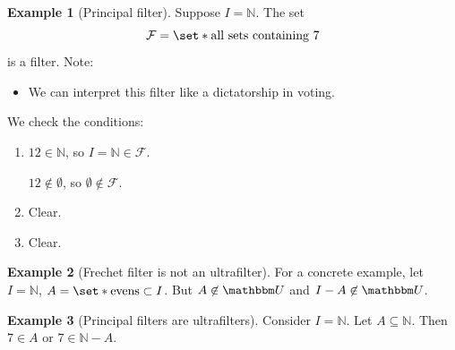 \documentclass[11pt]{article}
\numberwithin{equation}{section}
\theoremstyle{plain}
\theoremstyle{definition}
\newtheorem{example}{\color{WildStrawberry}Example}[section]
\def\Set{\set*}%
\def\ss{\subset}
\def\sse{\subseteq}
\newcommand{\1}{\mathbbm 1}
\newcommand{\NN}{\mathbb N}
\newcommand{\UU}{\mathbbm U}
\newcommand{\fF}{\mathcal F}
\begin{document}
\begin{example}[Principal filter]
	Suppose $I = \NN$. The set
	\begin{equation}
		\fF = \Set{\text{all sets containing } 7}
	\end{equation}
	is a filter. Note:
	\begin{itemize}
		\item We can interpret this filter like a dictatorship in voting.
	\end{itemize}
	We check the conditions:
	\begin{enumerate}
		\item $12 \in \NN$, so $I = \NN \in \fF$.

		$12 \not\in \emptyset$, so $\emptyset \not\in\fF$. 
		\item Clear.
		\item Clear. 
	\end{enumerate}
\end{example}

\begin{example}[Frechet filter is not an ultrafilter]
	For a concrete example, let $I = \NN$, $A = \Set{\text{evens}} \ss I$. But $A \not\in \UU$ and $I-A\not\in\UU$.  
\end{example}

\begin{example}[Principal filters are ultrafilters]
	Consider $I = \NN$. Let $A \sse \NN$. Then $7 \in A$ or $7 \in \NN - A$. 
\end{example}
\end{document}
